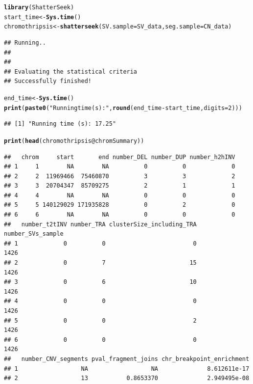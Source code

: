 \documentclass[twoside,a4wide,11pt]{article}\usepackage[]{graphicx}\usepackage[]{color}
\makeatletter
\newcommand{\hlnum}[1]{\textcolor[rgb]{0.686,0.059,0.569}{#1}}%
\newcommand{\hlstr}[1]{\textcolor[rgb]{0.192,0.494,0.8}{#1}}%
\newcommand{\hlopt}[1]{\textcolor[rgb]{0,0,0}{#1}}%
\newcommand{\hlstd}[1]{\textcolor[rgb]{0.345,0.345,0.345}{#1}}%
\newcommand{\hlkwb}[1]{\textcolor[rgb]{0.69,0.353,0.396}{#1}}%
\newcommand{\hlkwc}[1]{\textcolor[rgb]{0.333,0.667,0.333}{#1}}%
\newcommand{\hlkwd}[1]{\textcolor[rgb]{0.737,0.353,0.396}{\textbf{#1}}}%
\newenvironment{kframe}{%
 \def\at@end@of@kframe{}%
 \ifinner\ifhmode%
  \def\at@end@of@kframe{\end{minipage}}%
  \begin{minipage}{\columnwidth}%
 \fi\fi%
 \def\FrameCommand##1{\hskip\@totalleftmargin \hskip-\fboxsep
 \colorbox{shadecolor}{##1}\hskip-\fboxsep
     \hskip-\linewidth \hskip-\@totalleftmargin \hskip\columnwidth}%
 \MakeFramed {\advance\hsize-\width
   \@totalleftmargin\z@ \linewidth\hsize
   \@setminipage}}%
 {\par\unskip\endMakeFramed%
 \at@end@of@kframe}
\newenvironment{knitrout}{}{} %
\makeatother
\begin{document}
\begin{knitrout}
\color{fgcolor}\begin{kframe}
\begin{alltt}
\hlkwd{library}\hlstd{(ShatterSeek)}
\hlstd{start_time} \hlkwb{<-} \hlkwd{Sys.time}\hlstd{()}
\hlstd{chromothripsis} \hlkwb{<-} \hlkwd{shatterseek}\hlstd{(}\hlkwc{SV.sample}\hlstd{=SV_data,} \hlkwc{seg.sample}\hlstd{=CN_data)}
\end{alltt}
\begin{verbatim}
## Running..
## 
## 
## Evaluating the statistical criteria
## Successfully finished!
\end{verbatim}
\begin{alltt}
\hlstd{end_time} \hlkwb{<-} \hlkwd{Sys.time}\hlstd{()}
\hlkwd{print}\hlstd{(}\hlkwd{paste0}\hlstd{(}\hlstr{"Running time (s): "}\hlstd{,}\hlkwd{round}\hlstd{(end_time} \hlopt{-} \hlstd{start_time,}\hlkwc{digits}\hlstd{=}\hlnum{2}\hlstd{)))}
\end{alltt}
\begin{verbatim}
## [1] "Running time (s): 17.25"
\end{verbatim}
\begin{alltt}
\hlkwd{print}\hlstd{(}\hlkwd{head}\hlstd{(chromothripsis}\hlopt{@}\hlkwc{chromSummary}\hlstd{))}
\end{alltt}
\begin{verbatim}
##   chrom     start       end number_DEL number_DUP number_h2hINV
## 1     1        NA        NA          0          0             0
## 2     2  11969466  75460870          3          3             2
## 3     3  20704347  85709275          2          1             1
## 4     4        NA        NA          0          0             0
## 5     5 140129029 171935828          0          2             0
## 6     6        NA        NA          0          0             0
##   number_t2tINV number_TRA clusterSize_including_TRA number_SVs_sample
## 1             0          0                         0              1426
## 2             0          7                        15              1426
## 3             0          6                        10              1426
## 4             0          0                         0              1426
## 5             0          0                         2              1426
## 6             0          0                         0              1426
##   number_CNV_segments pval_fragment_joins chr_breakpoint_enrichment
## 1                  NA                  NA              8.612611e-17
## 2                  13           0.8653370              2.949495e-08

\end{verbatim}
\end{kframe}
\end{knitrout}
\end{document}

